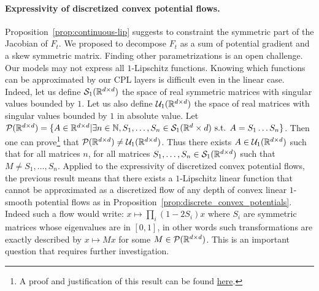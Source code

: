 \paragraph{Expressivity of discretized convex potential flows.}
Proposition~\ref{prop:continuous-lip} suggests to constraint the symmetric part of the Jacobian of $F_t$. We proposed to decompose $F_t$ as a sum of potential gradient and a skew symmetric matrix. Finding other parametrizations is an open challenge.
Our models may not express all $1$-Lipschitz functions.
Knowing which functions can be approximated by our CPL layers is difficult even in the linear case. Indeed, let us define $\mathcal{S}_1(\mathbb{R}^{d\times d})$ the space of real symmetric matrices with singular values bounded by $1$. Let us also define $\mathcal{U}_1(\mathbb{R}^{d\times d})$ the space of real matrices with singular values bounded by $1$ in absolute value.
Let $\mathcal{P}(\mathbb{R}^{d\times d})=\{A\in\mathbb{R}^{d\times d}|\exists n\in \mathbb{N},S_1,\dots,S_n\in \mathcal{S}_1(\mathbb{R}^d\times d)\text{ s.t. } A = S_1\dots S_n\}$. Then one can prove\footnote{A proof and justification of this result can be found \href{https://mathoverflow.net/questions/60174/factorization-of-a-real-matrix-into-hermitian-x-hermitian-is-it-stable}{here}.} that $\mathcal{P}(\mathbb{R}^{d\times d}) \neq \mathcal{U}_1(\mathbb{R}^{d\times d})$. Thus there exists $A\in\mathcal{U}_1(\mathbb{R}^{d\times d})$ such that for all matrices $n$, for all matrices $S_1,\dots,S_n\in\mathcal{S}_1(\mathbb{R}^{d\times d})$ such that $M\neq S_1,\dots,S_n$. Applied to the expressivity of discretized convex potential flows, the previous result means that there exists a $1$-Lipschitz linear function that cannot be approximated as a discretized flow of any depth of convex linear $1$-smooth potential flows as in Proposition~\ref{prop:discrete_convex_potentials}. Indeed such a flow would write: $x\mapsto\prod_i(1-2S_i)x$ where $S_i$ are symmetric matrices whose eigenvalues are in $[0,1]$, in other words such transformations are exactly described by $x\mapsto Mx$  for some $M\in\mathcal{P}(\mathbb{R}^{d\times d})$. This is  an important question that requires further investigation. 


